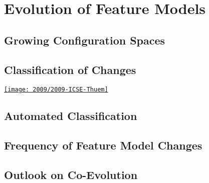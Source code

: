\documentclass[
	aspectratio=169, %
	8pt, %
	handout, %
]{beamer}
\subtitle{12. Evolution and Maintenance}
\author{Timo Kehrer, Thomas Thüm}
\begin{document}


\begin{frame}{\inserttitle}
	\lectureseriesoverview[12]
\end{frame}


\section{Evolution of Feature Models}

\subsection{Growing Configuration Spaces}

\subsection{Classification of Changes}
\begin{frame}{\insertsubsection}
	\begin{mycolumns}
		\href{https://github.com/SoftVarE-Group/Papers/blob/main/2009/2009-ICSE-Thuem.pdf}{\texttt{[image: 2009/2009-ICSE-Thuem]}}
	\mynextcolumn
	\end{mycolumns}
\end{frame}


\subsection{Automated Classification}
\subsection{Frequency of Feature Model Changes}

\subsection{Outlook on Co-Evolution}
\end{document}
